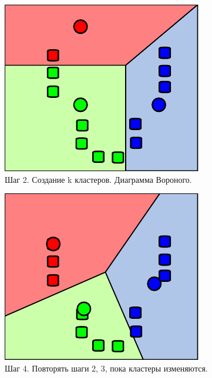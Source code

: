 \documentclass[xcolor=table]{beamer}
\begin{document}
\begin{frame}
\begin{columns}
    \begin{column}{0.5\textwidth}
      \begin{center}
        \includegraphics[scale=0.5]{data/km-s2}
        \\Шаг 2. Создание k кластеров. Диаграмма Вороного.

        \includegraphics[scale=0.5]{data/km-s4}
        \\Шаг 4. Повторять шаги 2, 3, пока кластеры изменяются.
      \end{center}
    \end{column}
  \end{columns}
\end{frame}
\end{document}

